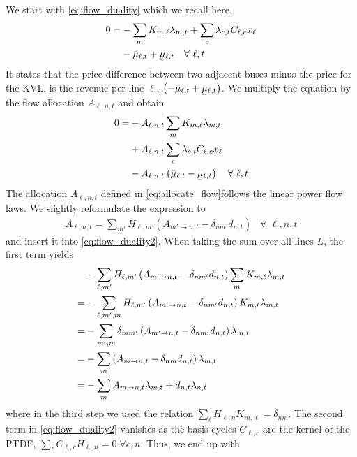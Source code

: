 \documentclass[11pt,twocolumn]{article}
\newcommand{\ubar}[1]{\underaccent{\bar}{#1}}
\newcommand{\Forall}[1]{\hspace{10pt} \forall \,\, #1 }
\newcommand{\mulowerflow}{\ubar{\mu}_{\ell,t}}
\newcommand{\muupperflow}{\bar{\mu}_{\ell,t}}
\newcommand{\lmp}[1][n]{\lambda_{#1,t}}
\newcommand{\demand}[1][n]{d_{#1,t}}
\newcommand{\incidence}[1][n]{K_{#1,\ell}}
\newcommand{\ptdf}[1][n]{H_{\ell,#1}}
\newcommand{\cycle}{C_{\ell,c}}
\newcommand{\reactance}{x_\ell}
\newcommand{\cycleprice}{\lambda_{c,t}}
\newcommand{\allocatepeer}[1][m \rightarrow n]{A_{#1,t}}
\newcommand{\allocateflow}[1][n]{A_{\ell,#1,t}}
\begin{document}
We start with \cref{eq:flow_duality} which we recall here, 
\begin{align}
    \notag
    0 = &- \sum_m \incidence[m] \lmp[m]  + \sum_c  \cycleprice \cycle \reactance  \\
    &- \muupperflow + \mulowerflow \Forall{\ell,t} 
\end{align}
It states that the price difference between two adjacent buses minus the price for the KVL, is the revenue per line $\ell$, $\left(- \muupperflow + \mulowerflow\right)$. We multiply the equation by the flow allocation $\allocateflow$ and obtain 
\begin{align}
    \notag
    0 =& - \allocateflow \sum_m \incidence[m] \lmp[m]  \\
    \notag
    &+ \allocateflow \sum_c  \cycleprice \cycle \reactance  \\
    &- \allocateflow \left(\muupperflow - \mulowerflow\right) \Forall{\ell,t} 
    \label{eq:flow_duality2}
\end{align}  
The allocation $\allocateflow$ defined in \cref{eq:allocate_flow}follows the linear power flow laws. We slightly reformulate the expression to
\begin{align}
    \allocateflow = \sum_{m'} \ptdf[m'] \left( \allocatepeer[m' \rightarrow n]  - \delta_{n m'} \demand \right) \Forall{\ell, n, t}
    \label{eq:allocate_flow2}
\end{align}
and insert it into \cref{eq:flow_duality2}. When taking the sum over all lines $L$, the first term yields  
\begin{align}
    \notag
    &- \sum_{\ell, m'} \ptdf[m'] \left( \allocatepeer[m' \rightarrow n]  - \delta_{n m'} \demand \right) \sum_m \incidence[m] \lmp[m] \\
    \notag
    =& - \sum_{\ell, m', m} \ptdf[m'] \left( \allocatepeer[m' \rightarrow n]  - \delta_{n m'} \demand \right) \incidence[m] \lmp[m] \\
    \notag
    =& - \sum_{m', m} \delta_{m m'} \left( \allocatepeer[m' \rightarrow n]  - \delta_{n m'} \demand \right) \lmp[m] \\
    \notag
    =& - \sum_{m} \left( \allocatepeer - \delta_{n m} \demand \right) \lmp[m] \\
    =& - \sum_{m} \allocatepeer \lmp[m] + \demand \lmp 
\end{align}
where in the third step we used the relation $\sum_\ell \ptdf \incidence[m] = \delta_{n m}$.
The second term in \cref{eq:flow_duality2} vanishes as the basis cycles $\cycle$ are the kernel of the PTDF, $\sum_{\ell} \cycle \ptdf  = 0 \; \forall c,n$. Thus, we end up with 
\end{document}

